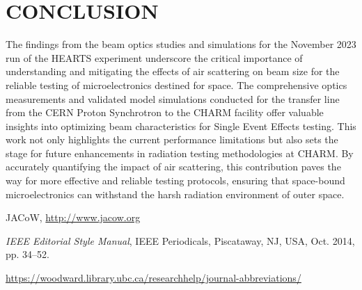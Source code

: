 \documentclass[a4paper,
               biblatex,     %
               ]{jacow}
\begin{document}
\section{CONCLUSION}

The findings from the beam optics studies and simulations for the November 2023 run of the HEARTS experiment underscore the critical importance of understanding and mitigating the effects of air scattering on beam size for the reliable testing of microelectronics destined for space. The comprehensive optics measurements and validated model simulations conducted for the transfer line from the CERN Proton Synchrotron to the CHARM facility offer valuable insights into optimizing beam characteristics for Single Event Effects testing. This work not only highlights the current performance limitations but also sets the stage for future enhancements in radiation testing methodologies at CHARM. By accurately quantifying the impact of air scattering, this contribution paves the way for more effective and reliable testing protocols, ensuring that space-bound microelectronics can withstand the harsh radiation environment of outer space.

%
	{\printbibliography}%
	{%
	
	\begin{thebibliography}{9} %
	
		JACoW,
		\url{http://www.jacow.org}
	
		\textit{IEEE Editorial Style Manual},
		IEEE Periodicals, Piscataway,
		NJ, USA, Oct. 2014, pp. 34--52.

	\url{https://woodward.library.ubc.ca/researchhelp/journal-abbreviations/}

	\end{thebibliography}
} %
\end{document}
